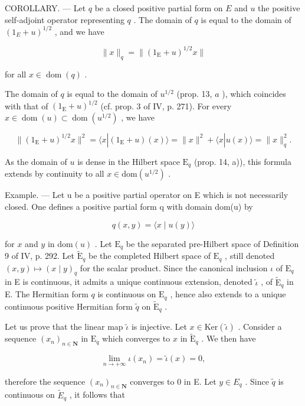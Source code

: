 COROLLARY. --- Let \(q\) be a closed positive partial form on \(E\) and \(u\) the positive self-adjoint operator representing \(q\) . The domain of \(q\) is equal to the domain of \((1_{E} + u)^{1/2}\) , and we have

\[
\| x \| _ {q} = \| (1 _ {\mathrm{E}} + u) ^ {1 / 2} x \|
\]

for all \(x \in \operatorname{dom}(q)\) .

The domain of \(q\) is equal to the domain of \(u^{1/2}\) (prop. 13, \(a\) ), which coincides with that of \((1_{\mathrm{E}} + u)^{1/2}\) (cf. prop. 3 of IV, p. 271). For every \(x \in \operatorname{dom}(u) \subset \operatorname{dom}(u^{1/2})\) , we have

\[
\| (1 _ {\mathrm{E}} + u) ^ {1 / 2} x \| ^ {2} = \langle x | (1 _ {\mathrm{E}} + u) (x) \rangle = \| x \| ^ {2} + \langle x | u (x) \rangle = \| x \| _ {q} ^ {2}.
\]

As the domain of \(u\) is dense in the Hilbert space \(\mathrm{E}_q\) (prop. 14, a)), this formula extends by continuity to all \(x \in \mathrm{dom}(u^{1/2})\) .

Example. --- Let u be a positive partial operator on E which is not necessarily closed. One defines a positive partial form q with domain dom(u) by

\[
q (x, y) = \langle x \mid u (y) \rangle
\]

for \(x\) and \(y\) in \(\mathrm{dom}(u)\) . Let \(\mathrm{E}_q\) be the separated pre-Hilbert space of Definition 9 of IV, p. 292. Let \(\widetilde{\mathrm{E}}_q\) be the completed Hilbert space of \(\mathrm{E}_q\) , still denoted \((x,y) \mapsto (x \mid y)_q\) for the scalar product. Since the canonical inclusion \(\iota\) of \(\mathrm{E}_q\) in E is continuous, it admits a unique continuous extension, denoted \(\widetilde{\iota}\) , of \(\widetilde{\mathrm{E}}_q\) in E. The Hermitian form \(q\) is continuous on \(\mathrm{E}_q\) , hence also extends to a unique continuous positive Hermitian form \(\widetilde{q}\) on \(\widetilde{\mathrm{E}}_q\) .

Let us prove that the linear map \(\widetilde{\iota}\) is injective. Let \(x\in\mathrm{Ker}(\widetilde{\iota})\) . Consider a sequence \((x_{n})_{n\in\mathbf{N}}\) in \(\mathrm{E}_{q}\) which converges to \(x\) in \(\widetilde{\mathrm{E}}_{q}\) . We then have

\[
\lim _ {n \to + \infty} \iota (x _ {n}) = \widetilde {\iota} (x) = 0,
\]

therefore the sequence \((x_{n})_{n\in\mathbf{N}}\) converges to 0 in E. Let \(y\in E_{q}\) . Since \(\widetilde{q}\) is continuous on \(\widetilde{E}_{q}\) , it follows that

